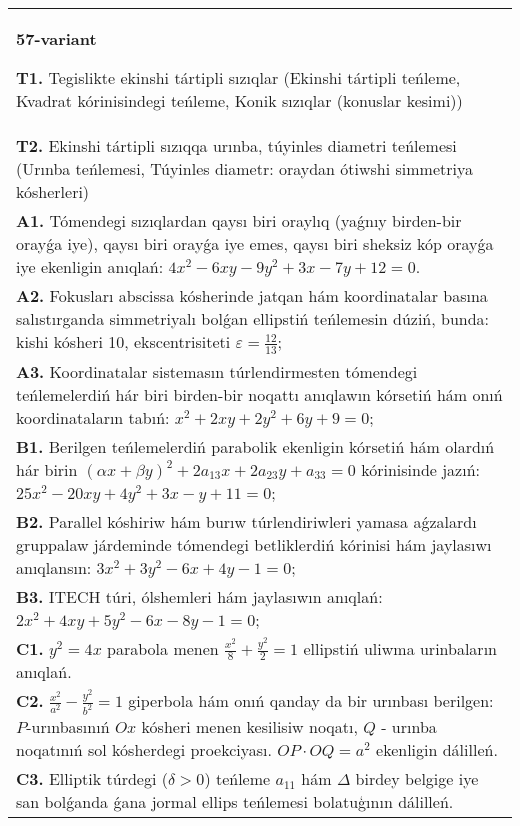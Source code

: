 \documentclass{article}
\begin{document}
\begin{tabular}{m{17cm}}
\textbf{57-variant}
\newline

\textbf{T1.} Tegislikte ekinshi tártipli sızıqlar (Ekinshi tártipli teńleme, Kvadrat kórinisindegi teńleme, Konik sızıqlar (konuslar kesimi)) \\
\textbf{T2.} Ekinshi tártipli sızıqqa urınba, túyinles diametri teńlemesi (Urınba teńlemesi, Túyinles diametr: oraydan ótiwshi simmetriya kósherleri) \\
\textbf{A1.} Tómendegi sızıqlardan qaysı biri oraylıq (yaǵnıy birden-bir orayǵa iye), qaysı biri orayǵa iye emes, qaysı biri sheksiz kóp orayǵa iye ekenligin anıqlań:  $4 x^2-6 x y-9 y^2+3 x-7 y+12=0$. \\
\textbf{A2.} Fokusları abscissa kósherinde jatqan hám koordinatalar basına salıstırganda simmetriyalı bolǵan ellipstiń teńlemesin dúziń, bunda: kishi kósheri 10, ekscentrisiteti $\varepsilon=\frac{12}{13}$; \\
\textbf{A3.} Koordinatalar sistemasın túrlendirmesten tómendegi teńlemelerdiń hár biri birden-bir noqattı anıqlawın kórsetiń hám onıń koordinataların tabıń: $x^2+2 x y+2 y^2+6 y+9=0$; \\
\textbf{B1.} Berilgen teńlemelerdiń parabolik ekenligin kórsetiń hám olardıń hár birin $(\alpha x+\beta y)^2+2 a_{13} x+2 a_{23} y+a_{33}=0$ kórinisinde jazıń: $25 x^2-20 x y+4 y^2+3 x-y+11=0$; \\
\textbf{B2.} Parallel kóshiriw hám burıw túrlendiriwleri yamasa aǵzalardı gruppalaw járdeminde tómendegi betliklerdiń kórinisi hám jaylasıwı anıqlansın: $3 x^2+3 y^2-6 x+4 y-1=0$; \\
\textbf{B3.} ITECH túri, ólshemleri hám jaylasıwın anıqlań: $2 x^2+4 x y+5 y^2-6 x-8 y-1=0$; \\
\textbf{C1.} $y^2=4 x$ parabola menen $\frac{x^2}{8}+\frac{y^2}{2}=1$ ellipstiń uliwma urinbaların anıqlań. \\
\textbf{C2.} $\frac{x^2}{a^2}-\frac{y^2}{b^2}=1$ giperbola hám onıń qanday da bir urınbası berilgen: $P$-urınbasınıń $O x$ kósheri menen kesilisiw noqatı, $Q$ - urınba noqatınıń sol kósherdegi proekciyası. $O P \cdot O Q=a^2$ ekenligin dálilleń. \\
\textbf{C3.} Elliptik túrdegi ($\delta>0$) teńleme $a_{11}$ hám $\Delta$ birdey belgige iye san bolǵanda ǵana jormal ellips teńlemesi bolatuģının dálilleń. \\

\end{tabular}
\vspace{1cm}
\end{document}

